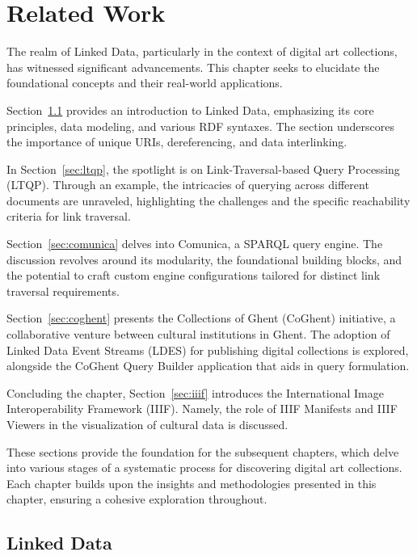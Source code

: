 \chapter{Related Work}
\label{chap:rel_work}

The realm of Linked Data, particularly in the context of digital art collections, has witnessed significant advancements. This chapter seeks to elucidate the foundational concepts and their real-world applications.

Section~\ref{sec:linked_data} provides an introduction to Linked Data, emphasizing its core principles, data modeling, and various RDF syntaxes. The section underscores the importance of unique URIs, dereferencing, and data interlinking.

In Section~\ref{sec:ltqp}, the spotlight is on Link-Traversal-based Query Processing (LTQP). Through an example, the intricacies of querying across different documents are unraveled, highlighting the challenges and the specific reachability criteria for link traversal.

Section~\ref{sec:comunica} delves into Comunica, a SPARQL query engine. The discussion revolves around its modularity, the foundational building blocks, and the potential to craft custom engine configurations tailored for distinct link traversal requirements.

Section~\ref{sec:coghent} presents the Collections of Ghent (CoGhent) initiative, a collaborative venture between cultural institutions in Ghent. The adoption of Linked Data Event Streams (LDES) for publishing digital collections is explored, alongside the CoGhent Query Builder application that aids in query formulation.

Concluding the chapter, Section~\ref{sec:iiif} introduces the International Image Interoperability Framework (IIIF). Namely, the role of IIIF Manifests and IIIF Viewers in the visualization of cultural data is discussed.

These sections provide the foundation for the subsequent chapters, which delve into various stages of a systematic process for discovering digital art collections. Each chapter builds upon the insights and methodologies presented in this chapter, ensuring a cohesive exploration throughout.

\section{Linked Data}
\label{sec:linked_data}

